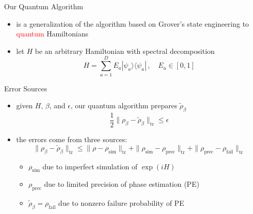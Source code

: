 \documentclass[slideColor]{prosper}
\renewcommand{\>}{\rangle}
\newcommand{\<}{\langle}
\begin{document}

\begin{slide}{Our Quantum Algorithm}
\begin{itemize}
\item is a generalization of the algorithm based on Grover's state engineering to \textcolor{red}{quantum} Hamiltonians

\bigskip
\item let $H$ be an arbitrary Hamiltonian with spectral decomposition
\[
H = \sum_{a=1}^D E_a |\psi_a\>\<\psi_a|\,, \quad E_a \in [0,1]
\]

\end{itemize}
\end{slide}


\begin{slide}{Error Sources}
\begin{itemize}
\item given $H$, $\beta$, and $\epsilon$, our quantum algorithm prepares $\tilde{\rho}_\beta$
\[
\frac{1}{2} \| \rho_\beta - \tilde{\rho}_\beta \|_{\mathrm{tr}} \le \epsilon 
\]

\medskip
\item the errors come from three sources:
\[
\| \rho_\beta           - \tilde{\rho}_\beta   \|_{\mathrm{tr}} \le 
\| \rho                 - \rho_{\textrm{sim}}  \|_{\mathrm{tr}} +
\| \rho_{\textrm{sim}}  - \rho_{\textrm{prec}} \|_{\mathrm{tr}} +
\| \rho_{\textrm{prec}} - \rho_{\textrm{fail}} \|_{\mathrm{tr}} 
\]

\medskip
\begin{itemize}
\item $\rho_{\textrm{sim}}$ due to imperfect simulation of $\exp(i H)$

\medskip
\item $\rho_{\textrm{prec}}$ due to limited precision of phase estimation (PE)

\medskip
\item $\tilde{\rho}_\beta=\rho_{\textrm{fail}}$ due to nonzero failure probability of PE
\end{itemize}
\end{itemize}
\end{slide}

\end{document}
